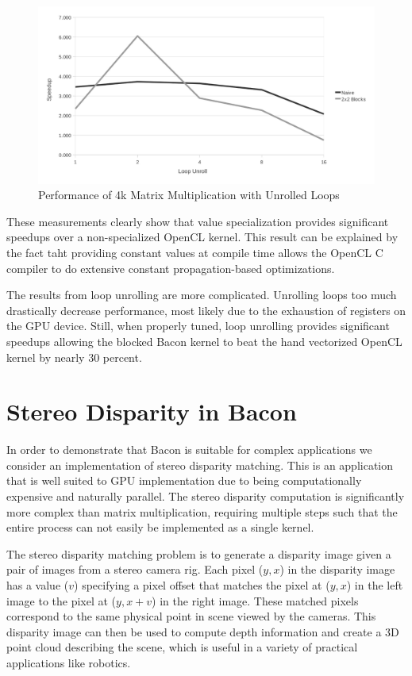 \documentclass{llncs}
\begin{document}
\begin{figure}[tbh]
\begin{center}
\includegraphics[clip]{unrolling}
\end{center}
\caption{Performance of 4k Matrix Multiplication with Unrolled Loops}\label{unroll}
\end{figure}

These measurements clearly show that value specialization provides
significant speedups over a non-specialized OpenCL kernel. This result
can be explained by the fact taht providing constant values at compile
time allows the OpenCL C compiler to do extensive constant
propagation-based optimizations.

The results from loop unrolling are more complicated. Unrolling loops
too much drastically decrease performance, most likely due to the
exhaustion of registers on the GPU device. Still, when properly tuned,
loop unrolling provides significant speedups allowing the blocked
Bacon kernel to beat the hand vectorized OpenCL kernel by nearly 30
percent.

\section{Stereo Disparity in Bacon}

In order to demonstrate that Bacon is suitable for complex
applications we consider an implementation of stereo disparity
matching. This is an application that is well suited to GPU
implementation due to being computationally expensive and naturally
parallel. The stereo disparity computation is significantly more
complex than matrix multiplication, requiring multiple steps such that
the entire process can not easily be implemented as a single kernel.

The stereo disparity matching problem is to generate a disparity image
given a pair of images from a stereo camera rig. Each pixel ($y,x$) in
the disparity image has a value ($v$) specifying a pixel offset that
matches the pixel at ($y,x$) in the left image to the pixel at
($y,x+v$) in the right image. These matched pixels correspond to the
same physical point in scene viewed by the cameras. This disparity
image can then be used to compute depth information and create a 3D
point cloud describing the scene, which is useful in a variety of
practical applications like robotics.
\end{document}
